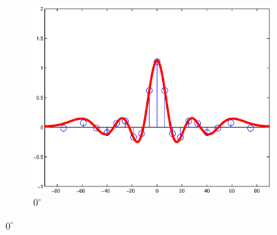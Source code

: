 \documentclass[spanish,openright]{book}
\begin{document}
\begin{figure}
\centering
\begin{subfigure}[b]{0.3\textwidth}
\includegraphics[width=\textwidth]{Sim_seg025_ang090}
\caption{$0^{\circ}$}
\label{fig:Sim_ang090}
\end{subfigure}



\end{figure}
\end{document}
